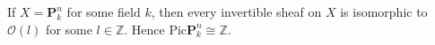 If $X = \mathbf{P}_k^n$ for some field $k$, then every invertible sheaf on $X$ is isomorphic to $\mathcal{O}(l)$ for some $l \in \mathbb{Z}$. Hence $\text{Pic} \mathbf{P}_k^n \cong \mathbb{Z}$.
